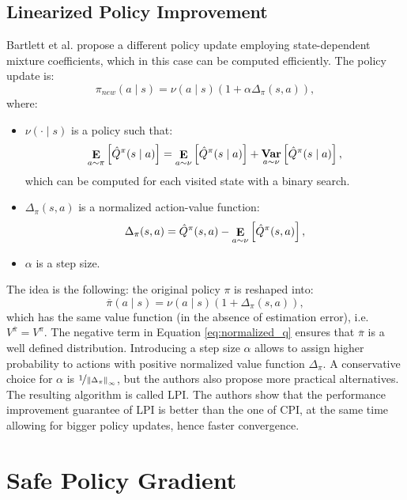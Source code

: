 \subsection{Linearized Policy Improvement}
Bartlett et al. \cite{abbasi2016fast} propose a different policy update employing state-dependent mixture coefficients, which in this case can be computed efficiently.
The policy update is:
\[
	\pi_{new}(a \mid s) = \nu(a \mid s)(1+\alpha\Delta_{\pi}(s,a)),
\]
where:
\begin{itemize}
\item $\nu(\cdot \mid s)$ is a policy such that:
\begin{equation}\label{eq:same_value}
\expected{a}{\pi}{\hat{Q}^{\pi}(s \mid a)} = \expected{a}{\nu}{\hat{Q}^{\pi}(s \mid a)} + 
	\mathop{\mathbf{Var}}\limits_{a \sim \nu}\left[\hat{Q}^{\pi}(s \mid a)\right],
\end{equation}
which can be computed for each visited state with a binary search.
\item $\Delta_\pi(s,a)$ is a normalized action-value function:
\begin{equation}\label{eq:normalized_q}
	\Delta_\pi(s,a) = \hat{Q}^\pi(s,a) - \expected{a}{\nu}{\hat{Q}^\pi(s,a)},
\end{equation}
\item $\alpha$ is a step size.
\end{itemize}
The idea is the following: the original policy $\pi$ is reshaped into:
\[
	\overline{\pi}(a \mid s) = \nu(a \mid s)(1+\Delta_{\pi}(s,a)),
\]
which has the same value function (in the absence of estimation error), i.e.\ $V^{\overline{\pi}} = V^\pi$. The negative term in Equation \ref{eq:normalized_q} ensures that $\overline{\pi}$ is a well defined distribution. Introducing a step size $\alpha$ allows to assign higher probability to actions with positive normalized value function $\Delta_\pi$. A conservative choice for $\alpha$ is $\nicefrac{1}{\norm[\infty]{\Delta_\pi}}$, but the authors also propose more practical alternatives.
The resulting algorithm is called \ac{LPI}. The authors show that the performance improvement guarantee of \ac{LPI} is better than the one of \ac{CPI}, at the same time allowing for bigger policy updates, hence faster convergence.

\section{Safe Policy Gradient}
